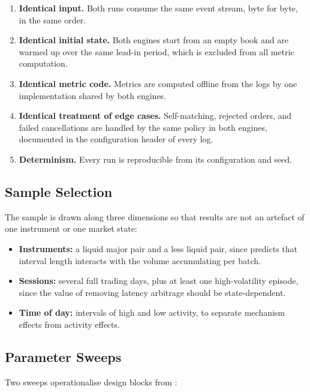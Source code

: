 \begin{enumerate}
  \item \textbf{Identical input.} Both runs consume the same event
  stream, byte for byte, in the same order.
  \item \textbf{Identical initial state.} Both engines start from an
  empty book and are warmed up over the same lead-in period, which is
  excluded from all metric computation.
  \item \textbf{Identical metric code.} Metrics are computed offline
  from the logs by one implementation shared by both engines.
  \item \textbf{Identical treatment of edge cases.} Self-matching,
  rejected orders, and failed cancellations are handled by the same
  policy in both engines, documented in the configuration header of
  every log.
  \item \textbf{Determinism.} Every run is reproducible from its
  configuration and seed.
\end{enumerate}

\subsection{Sample Selection}

The sample is drawn along three dimensions so that results are not an
artefact of one instrument or one market state:

\begin{itemize}
  \item \textbf{Instruments:} a liquid major pair and a less liquid pair,
  since  predicts that interval length interacts with
  the volume accumulating per batch.
  \item \textbf{Sessions:} several full trading days, plus at least one
  high-volatility episode, since the value of removing latency
  arbitrage should be state-dependent.
  \item \textbf{Time of day:} intervals of high and low activity, to
  separate mechanism effects from activity effects.
\end{itemize}

\subsection{Parameter Sweeps}

Two sweeps operationalise design blocks from :

